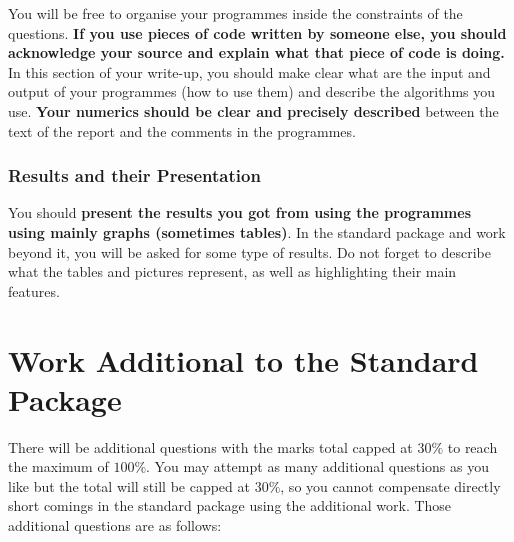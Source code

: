\documentclass[12pt]{article}
\begin{document}
You will be free to organise your programmes inside the constraints of the questions.
{\bf\magenta If you use pieces of code written by someone else, you should acknowledge your source
and explain what that piece of code is doing.} In this section of your write-up, you should make clear
what are the input and output of your programmes (how to use them) and describe the algorithms you use.
{\bf\magenta Your numerics should be clear and precisely described} between the text of the report
and the comments in the programmes.

\subsubsection{Results and their Presentation}

You should
{\magenta\bf present the results you got from using the programmes using mainly graphs (sometimes tables)}.
In the standard package and work beyond it, you will be asked for some type of results.
Do not forget to describe what the tables and pictures represent, as well as highlighting their main features.

\newpage

\section{Work Additional to the Standard Package}\label{sec3}

There will be additional questions with the marks total capped at $30\%$ to reach the maximum of $100\%$.
You may attempt as many additional questions as you like but the total will still be capped at $30\%$,
so you cannot compensate directly short comings in the standard package using the additional work.
Those additional questions are as follows:
\end{document}
